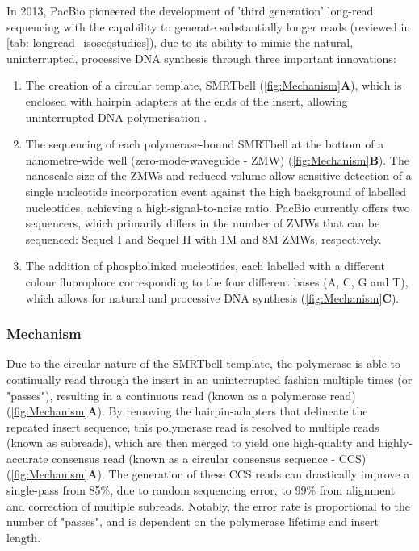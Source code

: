 In 2013, PacBio pioneered the development of 'third generation' long-read sequencing with the capability to generate substantially longer reads (reviewed in \cref{tab: longread_isoseqstudies}), due to its ability to mimic the natural, uninterrupted, processive DNA synthesis through three important innovations\cite{Eid2009}: 
\begin{enumerate}
	\item The creation of a circular template, SMRTbell (\cref{fig:Mechanism}\textbf{A}), which is enclosed with hairpin adapters at the ends of the insert, allowing uninterrupted DNA polymerisation \cite{Travers2010}.
	\item The sequencing of each polymerase-bound SMRTbell at the bottom of a nanometre-wide well (zero-mode-waveguide - ZMW)\cite{Levene2003} (\cref{fig:Mechanism}\textbf{B}). The nanoscale size of the ZMWs and reduced volume allow sensitive detection of a single nucleotide incorporation event against the high background of labelled nucleotides, achieving a high-signal-to-noise ratio. PacBio currently offers two sequencers, which primarily differs in the number of ZMWs that can be sequenced: Sequel I and Sequel II with 1M and 8M ZMWs, respectively.   
	\item The addition of phospholinked nucleotides, each labelled with a different colour fluorophore corresponding to the four different bases (A, C, G and T), which allows for natural and processive DNA synthesis\cite{Mccarthy2010} (\cref{fig:Mechanism}\textbf{C}). 
\end{enumerate}

\subsubsection{Mechanism}
Due to the circular nature of the SMRTbell template, the polymerase is able to continually read through the insert in an uninterrupted fashion multiple times (or "passes"), resulting in a continuous read (known as a polymerase read) (\cref{fig:Mechanism}\textbf{A}). By removing the hairpin-adapters that delineate the repeated insert sequence, this polymerase read is resolved to multiple reads (known as subreads), which are then merged to yield one high-quality and highly-accurate consensus read (known as a circular consensus sequence - CCS) (\cref{fig:Mechanism}\textbf{A}). The generation of these CCS reads can drastically improve a single-pass from 85\%, due to random sequencing error, to 99\% from alignment and correction of multiple subreads. Notably, the error rate is proportional to the number of "passes", and is dependent on the polymerase lifetime and insert length\cite{Travers2010}. 


